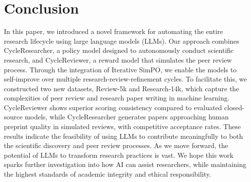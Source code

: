 \documentclass{article} %
\newcommand{\wjd}[1]{{\color{cyan}{[(Jindong) #1]}}}
\begin{document}



\section{Conclusion}

In this paper, we introduced a novel framework for automating the entire research lifecycle using large language models (LLMs). Our approach combines CycleResearcher, a policy model designed to autonomously conduct scientific research, and CycleReviewer, a reward model that simulates the peer review process. Through the integration of Iterative SimPO, we enable the models to self-improve over multiple research-review-refinement cycles. To facilitate this, we constructed two new datasets, Review-5k and Research-14k, which capture the complexities of peer review and research paper writing in machine learning. CycleReviewer shows superior scoring consistency compared to evaluated closed-source models, while CycleResearcher generates papers approaching human preprint quality in simulated reviews, with competitive acceptance rates. These results indicate the feasibility of using LLMs to contribute meaningfully to both the scientific discovery and peer review processes. As we move forward, the potential of LLMs to transform research practices is vast. We hope this work sparks further investigation into how AI can assist researchers, while maintaining the highest standards of academic integrity and ethical responsibility.




\end{document}
